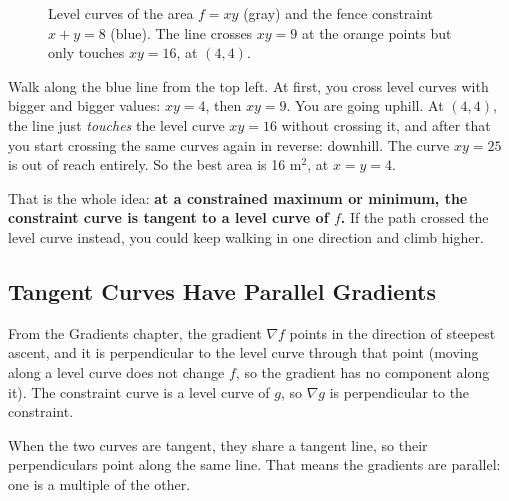 \begin{figure}[H]
\centering
{}
\caption{Level curves of the area $f = xy$ (gray) and the fence constraint
$x + y = 8$ (blue). The line crosses $xy = 9$ at the orange points but only
touches $xy = 16$, at $(4, 4)$.}
\label{fig:lagrange-contours}
\end{figure}

Walk along the blue line from the top left. At first, you cross level curves with
bigger and bigger values: $xy = 4$, then $xy = 9$. You are going uphill. At $(4, 4)$,
the line just \emph{touches} the level curve $xy = 16$ without crossing it, and after
that you start crossing the same curves again in reverse: downhill. The curve
$xy = 25$ is out of reach entirely. So the best area is 16 m$^2$, at $x = y = 4$.

That is the whole idea: \textbf{at a constrained maximum or minimum, the constraint
curve is tangent to a level curve of $f$.} If the path crossed the level curve
instead, you could keep walking in one direction and climb higher.

\subsection{Tangent Curves Have Parallel Gradients}
From the Gradients chapter, the gradient $\nabla f$ points in the direction of
steepest ascent, and it is perpendicular to the level curve through that point
(moving along a level curve does not change $f$, so the gradient has no component
along it). The constraint curve is a level curve of $g$, so $\nabla g$ is
perpendicular to the constraint.

When the two curves are tangent, they share a tangent line, so their perpendiculars
point along the same line. That means the gradients are parallel: one is a multiple
of the other.

